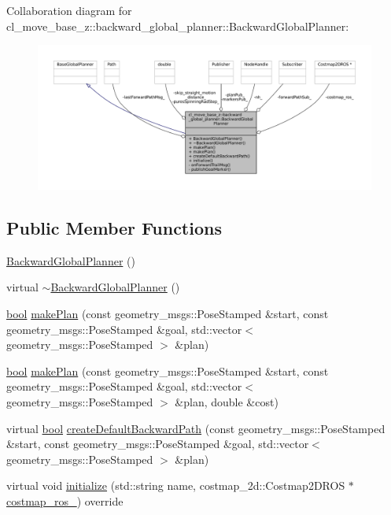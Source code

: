 Collaboration diagram for cl\+\_\+move\+\_\+base\+\_\+z\+:\+:backward\+\_\+global\+\_\+planner\+:\+:Backward\+Global\+Planner\+:
\nopagebreak
\begin{figure}[H]
\begin{center}
\leavevmode
\includegraphics[width=350pt]{classcl__move__base__z_1_1backward__global__planner_1_1BackwardGlobalPlanner__coll__graph}
\end{center}
\end{figure}
\subsection*{Public Member Functions}
\begin{DoxyCompactItemize}
\item 
\hyperlink{classcl__move__base__z_1_1backward__global__planner_1_1BackwardGlobalPlanner_a20888ea9b40dcbd86b8b12310a2ad60b}{Backward\+Global\+Planner} ()
\item 
virtual \hyperlink{classcl__move__base__z_1_1backward__global__planner_1_1BackwardGlobalPlanner_a2011b04d7fd3fa18ab940779ee6d6d8c}{$\sim$\+Backward\+Global\+Planner} ()
\item 
\hyperlink{classbool}{bool} \hyperlink{classcl__move__base__z_1_1backward__global__planner_1_1BackwardGlobalPlanner_a3f1f3c81e7c52c9305544fd793741a41}{make\+Plan} (const geometry\+\_\+msgs\+::\+Pose\+Stamped \&start, const geometry\+\_\+msgs\+::\+Pose\+Stamped \&goal, std\+::vector$<$ geometry\+\_\+msgs\+::\+Pose\+Stamped $>$ \&plan)
\item 
\hyperlink{classbool}{bool} \hyperlink{classcl__move__base__z_1_1backward__global__planner_1_1BackwardGlobalPlanner_a2fe289017031d072f4ac32d017fe989d}{make\+Plan} (const geometry\+\_\+msgs\+::\+Pose\+Stamped \&start, const geometry\+\_\+msgs\+::\+Pose\+Stamped \&goal, std\+::vector$<$ geometry\+\_\+msgs\+::\+Pose\+Stamped $>$ \&plan, double \&cost)
\item 
virtual \hyperlink{classbool}{bool} \hyperlink{classcl__move__base__z_1_1backward__global__planner_1_1BackwardGlobalPlanner_a1b4d2eb717f9f63f2309def37c6ce297}{create\+Default\+Backward\+Path} (const geometry\+\_\+msgs\+::\+Pose\+Stamped \&start, const geometry\+\_\+msgs\+::\+Pose\+Stamped \&goal, std\+::vector$<$ geometry\+\_\+msgs\+::\+Pose\+Stamped $>$ \&plan)
\item 
virtual void \hyperlink{classcl__move__base__z_1_1backward__global__planner_1_1BackwardGlobalPlanner_af17978c77ec96d4ecc26b3a6ba75e1e9}{initialize} (std\+::string name, costmap\+\_\+2d\+::\+Costmap2\+D\+R\+OS $\ast$\hyperlink{classcl__move__base__z_1_1backward__global__planner_1_1BackwardGlobalPlanner_a7103c15e6540a514acd421c3c6e194a4}{costmap\+\_\+ros\+\_\+}) override
\end{DoxyCompactItemize}
